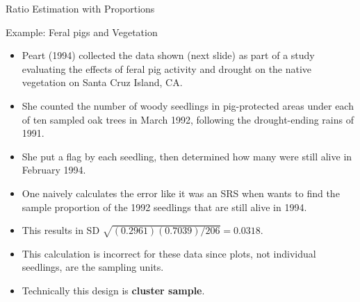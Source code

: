 \documentclass[10pt]{beamer}\usepackage[]{graphicx}\usepackage[]{xcolor}
\begin{document}
\begin{frame}{Ratio Estimation with Proportions}
\begin{block}{Example: Feral pigs and Vegetation}
\small
\begin{itemize}
\item Peart (1994) collected the data shown (next slide) as part of a study evaluating the effects of feral pig activity and drought on the native vegetation on Santa Cruz Island, CA.
\item She counted the number of woody seedlings in pig-protected areas under each of ten sampled oak trees in March 1992, following the drought-ending rains of 1991.
\item She put a flag by each seedling, then determined how many were still alive in February 1994. 
\item One naively calculates the error like it was an SRS when wants to find the sample proportion of the 1992 seedlings that are still alive in 1994.
\item This results in SD $\sqrt{(0.2961)(0.7039)/206}=0.0318.$
\item This calculation is incorrect for these data since plots, not individual seedlings, are the sampling units.
\item Technically this design is \textbf{cluster sample}.
\end{itemize}
\end{block}
\end{frame}
\end{document}
